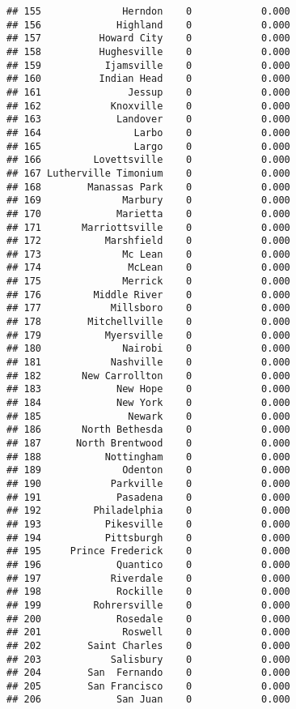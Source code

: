 \documentclass[]{article}
\begin{document}
\begin{verbatim}
## 155              Herndon    0            0.000
## 156             Highland    0            0.000
## 157          Howard City    0            0.000
## 158          Hughesville    0            0.000
## 159           Ijamsville    0            0.000
## 160          Indian Head    0            0.000
## 161               Jessup    0            0.000
## 162            Knoxville    0            0.000
## 163             Landover    0            0.000
## 164                Larbo    0            0.000
## 165                Largo    0            0.000
## 166         Lovettsville    0            0.000
## 167 Lutherville Timonium    0            0.000
## 168        Manassas Park    0            0.000
## 169              Marbury    0            0.000
## 170             Marietta    0            0.000
## 171       Marriottsville    0            0.000
## 172           Marshfield    0            0.000
## 173              Mc Lean    0            0.000
## 174               McLean    0            0.000
## 175              Merrick    0            0.000
## 176         Middle River    0            0.000
## 177            Millsboro    0            0.000
## 178        Mitchellville    0            0.000
## 179           Myersville    0            0.000
## 180              Nairobi    0            0.000
## 181            Nashville    0            0.000
## 182       New Carrollton    0            0.000
## 183             New Hope    0            0.000
## 184             New York    0            0.000
## 185               Newark    0            0.000
## 186       North Bethesda    0            0.000
## 187      North Brentwood    0            0.000
## 188           Nottingham    0            0.000
## 189              Odenton    0            0.000
## 190            Parkville    0            0.000
## 191             Pasadena    0            0.000
## 192         Philadelphia    0            0.000
## 193           Pikesville    0            0.000
## 194           Pittsburgh    0            0.000
## 195     Prince Frederick    0            0.000
## 196             Quantico    0            0.000
## 197            Riverdale    0            0.000
## 198             Rockille    0            0.000
## 199         Rohrersville    0            0.000
## 200             Rosedale    0            0.000
## 201              Roswell    0            0.000
## 202        Saint Charles    0            0.000
## 203            Salisbury    0            0.000
## 204        San  Fernando    0            0.000
## 205        San Francisco    0            0.000
## 206             San Juan    0            0.000

\end{verbatim}
\end{document}

